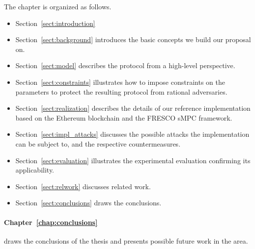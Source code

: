 \smallskip

The chapter is organized as follows.

\begin{itemize}
	
\item Section~\ref{sect:introduction}
	
\item Section~\ref{sect:background} introduces the basic concepts we build our proposal on. 

\item Section~\ref{sect:model} describes the protocol from a high-level perspective.

\item Section~\ref{sect:constraints} illustrates how to impose constraints on the parameters to protect the resulting protocol from rational adversaries.

\item Section~\ref{sect:realization} describes the details of our reference implementation based on the Ethereum blockchain and the FRESCO sMPC framework.

\item Section~\ref{sect:impl_attacks} discusses the possible attacks the implementation can be subject to, and the respective countermeasures.

\item Section~\ref{sect:evaluation} illustrates the experimental evaluation confirming its applicability.

\item Section~\ref{sect:relwork} discusses related work.

\item Section~\ref{sect:conclusions} draws the conclusions.
\end{itemize}

\medskip

\paragraph*{Chapter~\ref{chap:conclusions}} draws the conclusions of the thesis and presents possible future work in the area.

\bigskip

%

